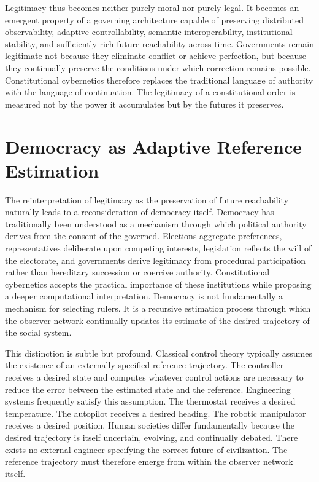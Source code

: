 \documentclass[12pt,a4paper]{article}
\begin{document}
Legitimacy thus becomes neither purely moral nor purely legal. It becomes an emergent property of a governing architecture capable of preserving distributed observability, adaptive controllability, semantic interoperability, institutional stability, and sufficiently rich future reachability across time. Governments remain legitimate not because they eliminate conflict or achieve perfection, but because they continually preserve the conditions under which correction remains possible. Constitutional cybernetics therefore replaces the traditional language of authority with the language of continuation. The legitimacy of a constitutional order is measured not by the power it accumulates but by the futures it preserves.

\section{Democracy as Adaptive Reference Estimation}

The reinterpretation of legitimacy as the preservation of future reachability naturally leads to a reconsideration of democracy itself. Democracy has traditionally been understood as a mechanism through which political authority derives from the consent of the governed. Elections aggregate preferences, representatives deliberate upon competing interests, legislation reflects the will of the electorate, and governments derive legitimacy from procedural participation rather than hereditary succession or coercive authority. Constitutional cybernetics accepts the practical importance of these institutions while proposing a deeper computational interpretation. Democracy is not fundamentally a mechanism for selecting rulers. It is a recursive estimation process through which the observer network continually updates its estimate of the desired trajectory of the social system.

This distinction is subtle but profound. Classical control theory typically assumes the existence of an externally specified reference trajectory. The controller receives a desired state and computes whatever control actions are necessary to reduce the error between the estimated state and the reference. Engineering systems frequently satisfy this assumption. The thermostat receives a desired temperature. The autopilot receives a desired heading. The robotic manipulator receives a desired position. Human societies differ fundamentally because the desired trajectory is itself uncertain, evolving, and continually debated. There exists no external engineer specifying the correct future of civilization. The reference trajectory must therefore emerge from within the observer network itself.
\end{document}
